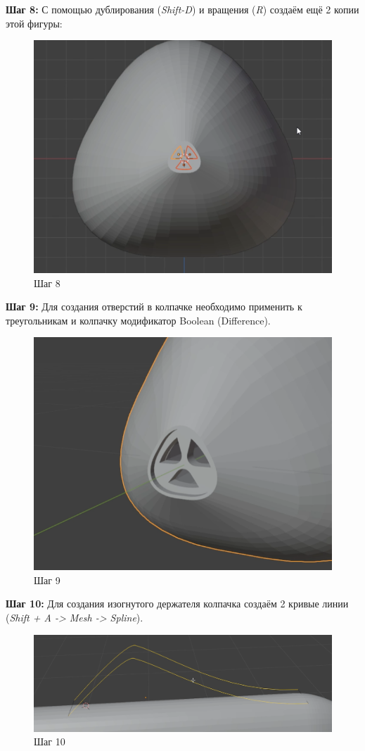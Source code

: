 \documentclass[areasetadvanced]{scrartcl}
\begin{document}
\par \textbf{Шаг 8:} С помощью дублирования (\textit{Shift-D}) и вращения (\textit{R}) создаём ещё 2 копии этой фигуры:
\begin{figure}[H]
    \label{4} 
    \centering
    \includegraphics[width=0.6\linewidth]{col/8.png}
    \caption{Шаг 8}
\end{figure} 


\par \textbf{Шаг 9:} Для создания отверстий в колпачке необходимо применить к треугольникам и колпачку модификатор Boolean (Difference).
\begin{figure}[H]
    \label{4} 
    \centering
    \includegraphics[width=0.6\linewidth]{col/9.png}
    \caption{Шаг 9}
\end{figure}


\par \textbf{Шаг 10:} Для создания изогнутого держателя колпачка создаём 2 кривые линии (\textit{Shift + A -> Mesh ->  Spline}).
\begin{figure}[H]
    \label{4} 
    \centering
    \includegraphics[width=0.6\linewidth]{col/10.png}
    \caption{Шаг 10}
\end{figure}
\end{document}
